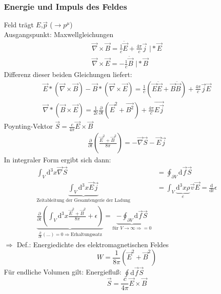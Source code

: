 \documentclass[a4paper]{article}
\begin{document}
\subsubsection{Energie und Impuls des Feldes}
Feld trägt $E$,$\vec{p}$ ($\rightarrow p^\mu$)\\
Ausgangspunkt: Maxwellgleichungen
\begin{align}
\vec{\nabla}\times\vec{B}=\frac{1}{c}\ddot{\vec{E}}+\frac{4\pi}{c}\vec{j}
\text{    |}*\vec{E}\\
\vec{\nabla}\times\vec{E}=-\frac{1}{c}\ddot{\vec{B}} \text{    |}*\vec{B}
\end{align}
Differenz dieser beiden Gleichungen liefert:
\begin{align}
\vec{E}*\left(\vec{\nabla}\times\vec{B}\right)-\vec{B}*\left(\vec{\nabla}
\times\vec{E}\right)=\frac{1}{c}(\vec{E}\ddot{\vec{E}}+\vec{B}\ddot{\vec{B}})
+\frac{4\pi}{c}\vec{j}\vec{E}\\
\vec{\nabla}*\left( \vec{B}\times\vec{E}\right)=\frac{1}{2c}
\frac{\partial}{\partial t}(\vec{E}^2+\vec{B^2})+\frac{4\pi}{c}\vec{E\vec{j}}
\end{align} 
Poynting-Vektor $\vec{S}=\frac{c}{4\pi}\vec{E}\times\vec{B}$
\begin{align}
\frac{\partial}{\partial t}\left( \frac{\vec{E}^2+\vec{B}^2}{8\pi} \right)
=-\vec{\nabla}\vec{S}-\vec{E}\vec{j}
\end{align}
In integraler Form ergibt sich dann:
\begin{align}
\int_V \mathrm{d}^3x \vec{\nabla}\vec{S}&=\oint_{\partial V}\mathrm{d}\!\vec{f}\vec{S}\\
\underbrace{\int_V \mathrm{d}^3x \vec{E}\vec{j}}_{\text{Zeitableitung der Gesamtengerie
der Ladung}}&=\int_V
\underbrace{\mathrm{d}^3x\rho}_{e}\vec{v}\vec{E}=\frac{\mathrm{d}}{\mathrm{d}t}\epsilon\\
\underbrace{\frac{\partial}{\partial t}\left(\int_V \mathrm{d}^3x
\frac{\vec{E}^2+\vec{B}^2}{8\pi} +\epsilon
\right)}_{\frac{\partial}{\partial t}\left( \ldots \right)=0 \Rightarrow
\text{Erhaltungssatz}} =\underbrace{-\oint_{\partial
V}\mathrm{d}\vec{f}\vec{S}}_{\text{für } V\rightarrow\infty \Rightarrow =0}
\end{align}
$\Rightarrow$ Def.: Energiedichte des elektromagnetischen Feldes
\begin{equation}
W=\frac{1}{8\pi}(\vec{E}^2+\vec{B}^2)
\end{equation}
Für endliche Volumen gilt: Energiefluß: $\oint \mathrm{d}\vec{f}\vec{S}$
\begin{equation}
\vec{S}=\frac{c}{4\pi}\vec{E}\times\vec{B}
\end{equation}
\end{document}
